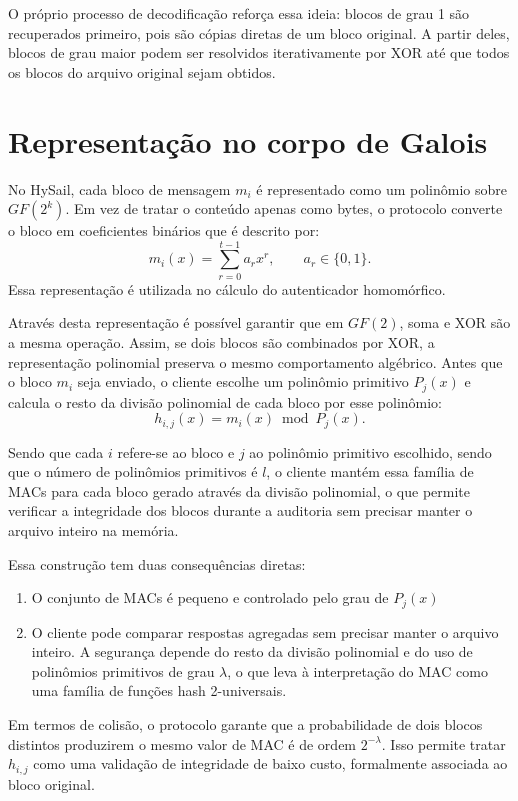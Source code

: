 O próprio processo de decodificação reforça essa ideia: blocos de grau 1 são recuperados primeiro, pois são
cópias diretas de um bloco original. A partir deles, blocos de grau maior podem ser resolvidos iterativamente
por XOR até que todos os blocos do arquivo original sejam obtidos.

\section{Representação no corpo de Galois}%
No HySail, cada bloco de mensagem \(m_i\) é representado como um polinômio sobre \(GF(2^k)\). Em vez de
tratar o conteúdo apenas como bytes, o protocolo converte o bloco em coeficientes binários que é descrito por:
\[
m_i(x) = \sum_{r=0}^{t-1} a_r x^r, \qquad a_r \in \{0,1\}.
\]
Essa representação é utilizada no cálculo do autenticador homomórfico.

Através desta representação é possível garantir que em \(GF(2)\), soma e XOR são a mesma operação. Assim, se dois blocos são
combinados por XOR, a representação polinomial preserva o mesmo comportamento algébrico.
Antes que o bloco \(m_i\) seja enviado, o cliente escolhe um polinômio primitivo \(P_j(x)\) e calcula o resto da divisão polinomial
de cada bloco por esse polinômio:
\[
h_{i,j}(x) = m_i(x) \bmod P_j(x).
\]

Sendo que cada \(i\) refere-se ao bloco e \(j\) ao polinômio primitivo escolhido, sendo que o número de polinômios primitivos é \(l\),
o cliente mantém essa família de MACs para cada bloco gerado através da divisão polinomial, o que permite verificar a integridade dos blocos durante a auditoria sem precisar
manter o arquivo inteiro na memória.

Essa construção tem duas consequências diretas:
\begin{enumerate}
  \item O conjunto de MACs é pequeno e controlado pelo grau de \(P_j(x)\)
  \item O cliente pode comparar respostas agregadas sem precisar manter o arquivo
inteiro. A segurança depende do resto da divisão polinomial e do uso de polinômios primitivos de
grau \(\lambda\), o que leva à interpretação do MAC como uma família de funções hash 2-universais.
\end{enumerate}

Em termos de colisão, o protocolo garante que a probabilidade de dois blocos distintos produzirem o mesmo valor de
MAC é de ordem \(2^{-\lambda}\). Isso permite tratar \(h_{i,j}\) como uma validação de integridade de baixo custo,
formalmente associada ao bloco original.

